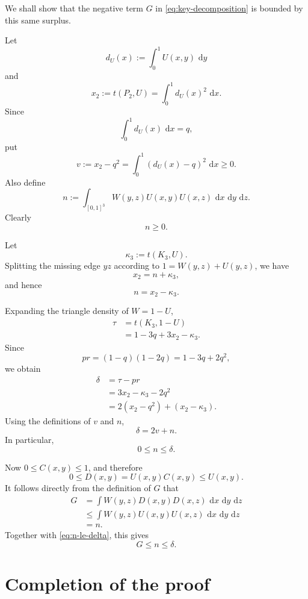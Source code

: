 \documentclass[11pt]{article}
\newcommand{\dd}{\,\mathrm{d}}
\begin{document}
We shall show that the negative term \(G\) in
\eqref{eq:key-decomposition} is bounded by this same surplus.

Let
\[
d_U(x):=\int_0^1U(x,y)\,\dd y
\]
and
\[
x_2:=t(P_2,U)
=
\int_0^1d_U(x)^2\,\dd x.
\]
Since
\[
\int_0^1d_U(x)\,\dd x=q,
\]
put
\[
v
:=
x_2-q^2
=
\int_0^1(d_U(x)-q)^2\,\dd x
\ge0.
\]
Also define
\begin{equation}\label{eq:n-def}
n
:=
\int_{[0,1]^3}
W(y,z)U(x,y)U(x,z)
\,\dd x\,\dd y\,\dd z.
\end{equation}
Clearly
\[
n\ge0.
\]

Let
\[
\kappa_3:=t(K_3,U).
\]
Splitting the missing edge \(yz\) according to
\(1=W(y,z)+U(y,z)\), we have
\[
x_2=n+\kappa_3,
\]
and hence
\begin{equation}\label{eq:n-x2}
n=x_2-\kappa_3.
\end{equation}

Expanding the triangle density of \(W=1-U\),
\[
\begin{aligned}
\tau
&=
t(K_3,1-U)\\
&=
1-3q+3x_2-\kappa_3.
\end{aligned}
\]
Since
\[
pr
=
(1-q)(1-2q)
=
1-3q+2q^2,
\]
we obtain
\[
\begin{aligned}
\delta
&=
\tau-pr\\
&=
3x_2-\kappa_3-2q^2\\
&=
2(x_2-q^2)+(x_2-\kappa_3).
\end{aligned}
\]
Using the definitions of \(v\) and \(n\),
\begin{equation}\label{eq:delta-decomp}
\boxed{
\delta=2v+n.
}
\end{equation}
In particular,
\begin{equation}\label{eq:n-le-delta}
0\le n\le\delta.
\end{equation}

Now \(0\le C(x,y)\le1\), and therefore
\[
0\le D(x,y)
=
U(x,y)C(x,y)
\le U(x,y).
\]
It follows directly from the definition of \(G\) that
\[
\begin{aligned}
G
&=
\int
W(y,z)
D(x,y)D(x,z)
\,\dd x\,\dd y\,\dd z\\
&\le
\int
W(y,z)
U(x,y)U(x,z)
\,\dd x\,\dd y\,\dd z\\
&=
n.
\end{aligned}
\]
Together with \eqref{eq:n-le-delta}, this gives
\begin{equation}\label{eq:G-delta}
\boxed{
G\le n\le\delta.
}
\end{equation}

\section{Completion of the proof}
\end{document}
